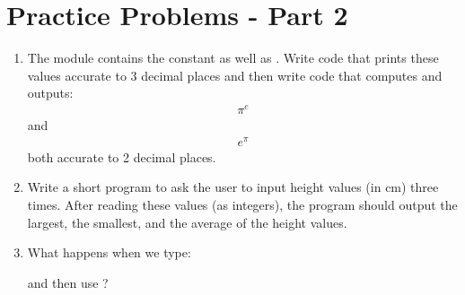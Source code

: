 \documentclass[letterpaper,10pt,english]{sphinxmanual}
\begin{document}
\section{Practice Problems - Part 2}
\label{\detokenize{lecture_notes/lec04_modules_functions1:practice-problems-part-2}}\begin{enumerate}
\def\theenumi{\arabic{enumi}}
\def\labelenumi{\theenumi .}
\makeatletter\def\p@enumii{\p@enumi \theenumi .}\makeatother
\item {} 
The  module contains the constant  as well as .
Write code that prints these values accurate to 3 decimal places
and then write code that computes and outputs:
\begin{equation*}
\begin{split}\pi^e\end{split}
\end{equation*}
and
\begin{equation*}
\begin{split}e^\pi\end{split}
\end{equation*}
both accurate to 2 decimal places.

\item {} 
Write a short program to ask the user to input height
values (in cm) three times.  After reading these values (as
integers), the program should output the largest, the smallest, and
the average of the height values.

\item {} 
What happens when we type:

\begin{sphinxVerbatim}[commandchars=\\\{\}]
 
  
\end{sphinxVerbatim}

and then use ?

\end{enumerate}
\end{document}

